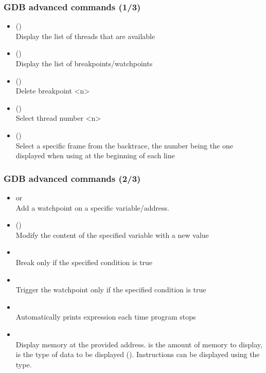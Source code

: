 {
\begin{frame}
  \frametitle{GDB advanced commands (1/3)}
  \small
  \begin{itemize}
    \item {} ()\\
      Display the list of threads that are available
    \item {} ()\\
      Display the list of breakpoints/watchpoints
    \item {} ()\\
      Delete breakpoint <n>
    \item {} ()\\
      Select thread number <n>
    \item {} ()\\
      Select a specific frame from the backtrace, the number being the one
      displayed when using  at the beginning of each line
  \end{itemize}
\end{frame}

\begin{frame}
  \frametitle{GDB advanced commands (2/3)}
  \small
  \begin{itemize}
    \item {} or \\
      Add a watchpoint on a specific variable/address.
    \item {} ()\\
      Modify the content of the specified variable with a new value
    \item {}\\
      Break only if the specified condition is true
    \item {}\\
      Trigger the watchpoint only if the specified condition is true
    \item {}\\
      Automatically prints expression each time program stops
    \item {}\\
      Display memory at the provided address.  is the amount of memory to
      display,  is the type of data to be displayed ().
      Instructions can be displayed using the  type.
  \end{itemize}
\end{frame}

}
